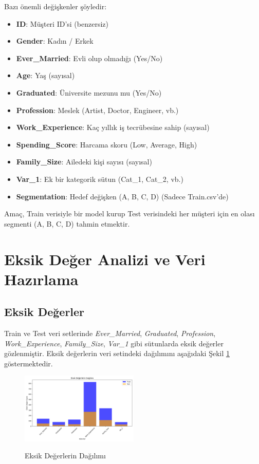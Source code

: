 \documentclass{article}
\begin{document}
\noindent
Bazı önemli değişkenler şöyledir:
\begin{itemize}
    \item \textbf{ID}: Müşteri ID'si (benzersiz)
    \item \textbf{Gender}: Kadın / Erkek
    \item \textbf{Ever\_Married}: Evli olup olmadığı (Yes/No)
    \item \textbf{Age}: Yaş (sayısal)
    \item \textbf{Graduated}: Üniversite mezunu mu (Yes/No)
    \item \textbf{Profession}: Meslek (Artist, Doctor, Engineer, vb.)
    \item \textbf{Work\_Experience}: Kaç yıllık iş tecrübesine sahip (sayısal)
    \item \textbf{Spending\_Score}: Harcama skoru (Low, Average, High)
    \item \textbf{Family\_Size}: Ailedeki kişi sayısı (sayısal)
    \item \textbf{Var\_1}: Ek bir kategorik sütun (Cat\_1, Cat\_2, vb.)
    \item \textbf{Segmentation}: Hedef değişken (A, B, C, D) (Sadece Train.csv'de)
\end{itemize}

Amaç, Train verisiyle bir model kurup Test verisindeki her müşteri için en olası segmenti (A, B, C, D) tahmin etmektir.

\section{Eksik Değer Analizi ve Veri Hazırlama}

\subsection{Eksik Değerler}

Train ve Test veri setlerinde \textit{Ever\_Married}, \textit{Graduated}, \textit{Profession}, \textit{Work\_Experience}, \textit{Family\_Size}, \textit{Var\_1} gibi sütunlarda eksik değerler gözlenmiştir. Eksik değerlerin veri setindeki dağılımını aşağıdaki Şekil \ref{fig:missing_values} göstermektedir.

\begin{figure}[H]
    \centering
    {\shorthandoff{=}
    \includegraphics[width=0.5\textwidth]{missing_values_distribution.png}
    }
    \caption{Eksik Değerlerin Dağılımı}
    \label{fig:missing_values}
\end{figure}
\end{document}

